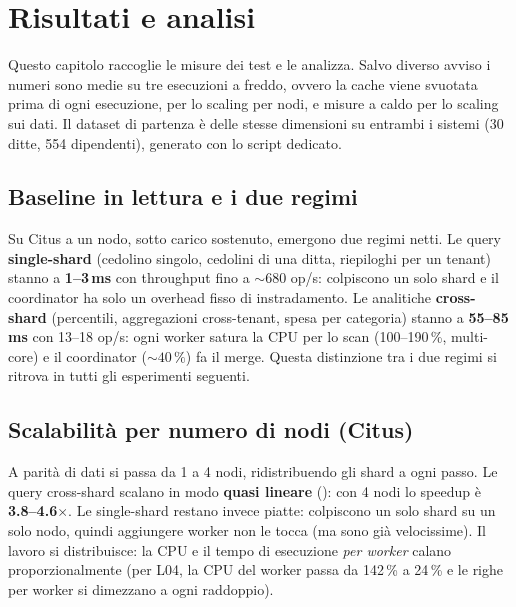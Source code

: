 \chapter{Risultati e analisi}
\label{ch:risultati}

Questo capitolo raccoglie le misure dei test e le analizza. Salvo diverso avviso i numeri sono medie su tre esecuzioni
a freddo, ovvero la cache viene svuotata prima di ogni esecuzione, per lo scaling per nodi, e misure a caldo per lo scaling sui dati. 
Il dataset di partenza è delle stesse dimensioni su entrambi i sistemi (30 ditte, 554 dipendenti), generato con lo script dedicato.

\section{Baseline in lettura e i due regimi}
\label{sec:baseline}

Su Citus a un nodo, sotto carico sostenuto, emergono due regimi netti. Le query \textbf{single-shard} (cedolino singolo, cedolini di una ditta, riepiloghi per un tenant) stanno a \textbf{1--3\,ms} con throughput
fino a ${\sim}680$ op/s: colpiscono un solo shard e il coordinator ha solo un overhead fisso di instradamento. Le analitiche \textbf{cross-shard} (percentili, aggregazioni cross-tenant, spesa per categoria)
stanno a \textbf{55--85\,ms} con 13--18 op/s: ogni worker satura la CPU per lo scan (100--190\,\%, multi-core)
e il coordinator (${\sim}40\,\%$) fa il merge. Questa distinzione tra i due regimi si ritrova in tutti gli esperimenti seguenti.

\section{Scalabilità per numero di nodi (Citus)}
\label{sec:scaling-nodi}

A parità di dati si passa da 1 a 4 nodi, ridistribuendo gli shard a ogni passo. Le query cross-shard scalano
in modo \textbf{quasi lineare} (): con 4 nodi lo speedup è
\textbf{3.8--4.6$\times$}. Le single-shard restano invece piatte: colpiscono un solo shard su un solo nodo,
quindi aggiungere worker non le tocca (ma sono già velocissime). Il lavoro si distribuisce: la CPU e il tempo
di esecuzione \emph{per worker} calano proporzionalmente (per L04, la CPU del worker passa da 142\,\% a 24\,\%
e le righe per worker si dimezzano a ogni raddoppio).

